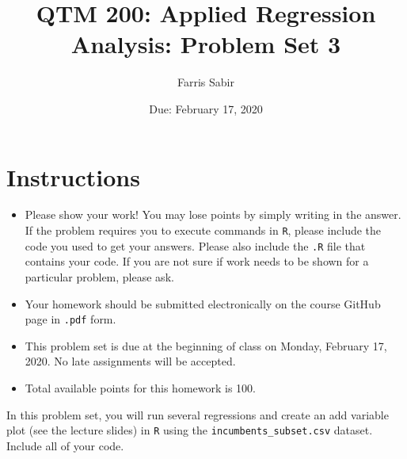 \documentclass[12pt,letterpaper]{article}
\title{QTM 200: Applied Regression Analysis: Problem Set 3}
\date{Due: February 17, 2020}
\author{Farris Sabir}
\begin{document}
	\maketitle
	
	\section*{Instructions}
	\begin{itemize}
		\item Please show your work! You may lose points by simply writing in the answer. If the problem requires you to execute commands in \texttt{R}, please include the code you used to get your answers. Please also include the \texttt{.R} file that contains your code. If you are not sure if work needs to be shown for a particular problem, please ask.
		\item Your homework should be submitted electronically on the course GitHub page in \texttt{.pdf} form.
		\item This problem set is due at the beginning of class on Monday, February 17, 2020. No late assignments will be accepted.
		\item Total available points for this homework is 100.
	\end{itemize}
	
		\vspace{.25cm}
	
\noindent In this problem set, you will run several regressions and create an add variable plot (see the lecture slides) in \texttt{R} using the \texttt{incumbents\_subset.csv} dataset. Include all of your code.

	\vspace{.5cm}
\end{document}
